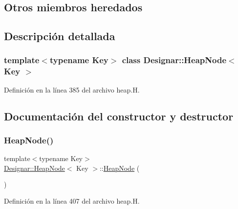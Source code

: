 \subsection*{Otros miembros heredados}


\subsection{Descripción detallada}
\subsubsection*{template$<$typename Key$>$\newline
class Designar\+::\+Heap\+Node$<$ Key $>$}



Definición en la línea 385 del archivo heap.\+H.



\subsection{Documentación del constructor y destructor}
\mbox{\label{class_designar_1_1_heap_node_ae38c08903f2c52e19c71d392661893f2}} 
\subsubsection{\texorpdfstring{Heap\+Node()}{HeapNode()}\hspace{0.1cm}{\footnotesize\ttfamily [1/4]}}
{\footnotesize\ttfamily template$<$typename Key$>$ \\
\hyperlink{class_designar_1_1_heap_node}{Designar\+::\+Heap\+Node}$<$ Key $>$\+::\hyperlink{class_designar_1_1_heap_node}{Heap\+Node} (\begin{DoxyParamCaption}{ }\end{DoxyParamCaption})\hspace{0.3cm}{\ttfamily [inline]}}



Definición en la línea 407 del archivo heap.\+H.

\mbox{\label{class_designar_1_1_heap_node_ac5b4c9acb233f72e70b0dc3f4a46e3b5}} 
